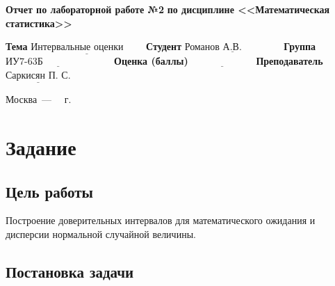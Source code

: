 \documentclass[12pt]{report}
\begin{document}
\begin{titlepage}
		\begin{center}
			\noindent\begin{minipage}{1.1\textwidth}\centering
				\Large\textbf{  Отчет по лабораторной работе №2}\newline
				\textbf{по дисциплине <<Математическая статистика>>}\newline\newline\newline\newline
			\end{minipage}
		\end{center}
		
		\noindent\textbf{Тема} $\underline{\text{Интервальные оценки~~~~~~}}$\newline\newline
		\noindent\textbf{Студент} $\underline{\text{Романов А.В.~~~~~~~~~~~~}}$\newline\newline
		\noindent\textbf{Группа} $\underline{\text{ИУ7-63Б~~~~~~~~~~~~~~~~~~~~~}}$\newline\newline
		\noindent\textbf{Оценка (баллы)} $\underline{\text{~~~~~~~~~~~~~~~~~~~}}$\newline\newline
		\noindent\textbf{Преподаватель} $\underline{\text{Саркисян П. С.}}$\newline\newline\newline
		
		\begin{center}
			\vfill
			Москва~---~\the\year
			~г.
		\end{center}
	\end{titlepage}

\chapter*{Задание}

\section*{Цель работы}
Построение доверительных интервалов для математического ожидания и дисперсии нормальной случайной величины.

\section*{Постановка задачи}
\end{document}
